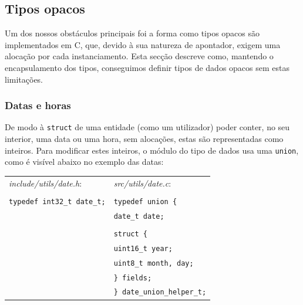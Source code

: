 \documentclass[12pt, a4paper]{article}
\begin{document}
\subsection{Tipos opacos}

Um dos nossos obstáculos principais foi a forma como tipos opacos são implementados em C, que,
devido à sua natureza de apontador, exigem uma alocação por cada instanciamento. Esta secção
descreve como, mantendo o encapsulamento dos tipos, conseguimos definir tipos de dados opacos sem
estas limitações.

\subsubsection{Datas e horas}

De modo à \texttt{struct} de uma entidade (como um utilizador) poder conter, no seu interior, uma
data ou uma hora, sem alocações, estas são representadas como inteiros. Para modificar estes
inteiros, o módulo do tipo de dados usa uma \texttt{union}, como é visível abaixo no exemplo das
datas:


\begin{spacing}{1}
\begin{center}
    \begin{tabular}{ |l|l| }
        \hline
        \emph{include/utils/date.h}: & \emph{src/utils/date.c}: \\
        & \\
        \texttt{typedef int32\_t date\_t;} & \texttt{typedef union \{} \\
                                           & \texttt{\hspace{0.5cm}date\_t date;} \\
                                           & \texttt{} \\
                                           & \texttt{\hspace{0.5cm}struct \{} \\
                                           & \texttt{\hspace{1cm}uint16\_t year;} \\
                                           & \texttt{\hspace{1cm}uint8\_t month, day;} \\
                                           & \texttt{\hspace{0.5cm}\} fields;} \\
                                           & \texttt{\} date\_union\_helper\_t;} \\
        \hline
    \end{tabular}
\end{center}
\end{spacing}
\end{document}
